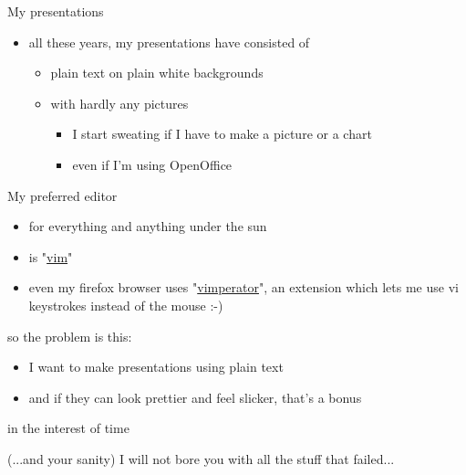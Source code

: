 \documentclass{beamer}
\begin{document}
\begin{frame}{My presentations}

\begin{itemize}
\item
all these years, my presentations have consisted of
\begin{itemize}
\item
plain text on plain white backgrounds
\item
with hardly any pictures
\begin{itemize}
\pause
\item
I start sweating if I have to make a picture or a chart
\pause
\item
even if I'm using OpenOffice
\end{itemize}
\end{itemize}
\end{itemize}



\end{frame}

\begin{frame}{My preferred editor}

\begin{itemize}
\item
for everything and anything under the sun
\pause
\item
is "\href{http://www.vim.org}{vim}"
\pause
\item
even my firefox browser uses
"\href{http://vimperator.mozdev.org/}{vimperator}", an extension which lets me
use vi keystrokes instead of the mouse :-)
\end{itemize}



\end{frame}

\begin{frame}{so the problem is this:}

\begin{itemize}
\pause
\item
I want to make presentations using plain text
\pause
\item
and if they can look prettier and feel slicker, that's a bonus
\end{itemize}



\end{frame}

\begin{frame}{in the interest of time}

(...and your sanity)
\linebreak
\linebreak
I will not bore you with all the stuff that failed...



\end{frame}
\end{document}
